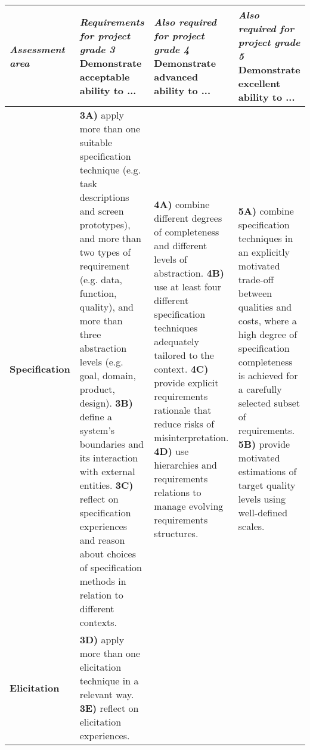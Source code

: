 \begin{adjustbox}{width=1.0\textwidth}
\begin{tabular}{| p{2.3cm} |p{6.2cm} | p{6.2cm} | p{6.2cm} |}
\hline
{\it Assessment area} & {\it Requirements for project grade {\bf 3}} \newline Demonstrate {\bf acceptable} ability to ... & {\it Also required for project grade {\bf 4}} \newline Demonstrate {\bf advanced} ability to ...& {\it Also required for project grade {\bf 5}} \newline Demonstrate {\bf excellent} ability to ... \\
\hline
\hline
{\bf Specification} &
    {\bf 3A)} apply more than one suitable specification technique (e.g. task descriptions and screen prototypes), and more than two types of requirement (e.g. data, function, quality), and more than three abstraction levels (e.g. goal, domain, product, design). \newline
    {\bf 3B)} define a system's boundaries and its interaction with external entities. \newline
    {\bf 3C)} reflect on specification experiences and reason about choices of specification methods in relation to different contexts. &
    {\bf 4A)} combine different degrees of completeness and different levels of abstraction. \newline
    {\bf 4B)} use at least four different specification techniques adequately tailored to the context. \newline
    {\bf 4C)} provide explicit requirements rationale that reduce risks of misinterpretation. \newline
    {\bf 4D)} use hierarchies and requirements relations to manage evolving requirements structures. &
    {\bf 5A)} combine specification techniques in an explicitly motivated trade-off between qualities and costs, where a high degree of specification completeness is achieved for a carefully selected subset of requirements.     \newline
    {\bf 5B)} provide motivated estimations of target quality levels using well-defined scales.
\\ \hline

{\bf Elicitation}  &
    {\bf 3D)} apply more than one elicitation technique in a relevant way. \newline
    {\bf 3E)} reflect on elicitation experiences. &


\end{tabular}
\end{adjustbox}
